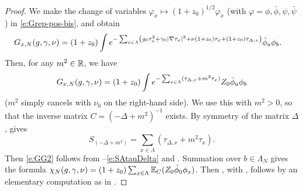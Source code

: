 \begin{proof}
We make the change of variables
$\varphi_x \mapsto (1 + z_0)^{1/2} \varphi_x$ (with $\varphi = \phi, \bar\phi, \psi, \bar\psi$)
in \eqref{e:Grep-pos-bis}, and obtain
\begin{align}
    G_{x,N}(g, \gamma, \nu)
    &=  (1+z_0)
    \int
    e^{-\sum_{x\in\Lambda}
    \left(
    g_0 \tau_x^2 + \gamma_0 |\nabla \tau_x|^2
    + \nu (1+z_0) \tau_x + (1+z_0)\tau_{\Delta,x}\right)} \bar\phi_a \phi_b
    .
    \label{e:Grep-pos}
\end{align}
Then, for any $m^2 \in{\mathbb R}$, we have
\begin{equation}
\lbeq{GNint}
G_{x,N}(\gcc, \gamma, \nu)
    =
(1 + z_0) \int
e^{-\sum_{x\in\Lambda} (\tau_{\Delta,x} + m^2 \tau_x)}
Z_0 \bar\phi_a \phi_b
\end{equation}
($m^2$ simply cancels with $\nu_0$ on the right-hand side).
We use this with $m^2>0$, so that the inverse matrix $C=(-\Delta+m^2)^{-1}$ exists.
By symmetry of the matrix $\Delta$,  gives
\begin{equation}
\label{e:SAtauDelta}
S_{(-\Delta+m^2)}
=
\sum_{x\in\Lambda} \left( \tau_{\Delta,x}
+ m^2  \tau_x \right).
\end{equation}
Then \eqref{e:GG2} follows from --\eqref{e:SAtauDelta} and .  Summation
over $b\in \Lambda_N$ gives the formula $\chi_N(g,\gamma,\nu) = (1+z_0)\sum_{x\in \Lambda} \mathbb{E}_C
(Z_0\bar\phi_0\phi_x)$.  Then , with , follows
by an elementary computation as in \cite[Section~\ref{log-sec:ga}]{BBS-saw4-log}.
\end{proof}